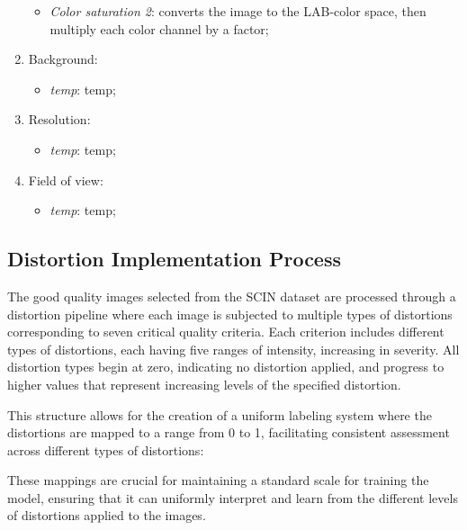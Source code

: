 \begin{enumerate}
\begin{itemize}
            \item \textit{Color saturation 2}: converts the image to the LAB-color space, then multiply each color channel by a factor;
        \end{itemize}
    \item Background:
        \begin{itemize}
            \item \textit{temp}: temp;
        \end{itemize}
    \item Resolution:
        \begin{itemize}
            \item \textit{temp}: temp;
        \end{itemize}
    \item Field of view:
        \begin{itemize}
            \item \textit{temp}: temp;
        \end{itemize}
\end{enumerate}

\subsection{Distortion Implementation Process}
\label{sub:DistImplement}
The good quality images selected from the SCIN dataset are processed through a distortion pipeline where each image is subjected to multiple types of distortions corresponding to seven critical quality criteria. Each criterion includes different types of distortions, each having five ranges of intensity, increasing in severity. All distortion types begin at zero, indicating no distortion applied, and progress to higher values that represent increasing levels of the specified distortion. \par
\vspace{\baselineskip}
\noindent
This structure allows for the creation of a uniform labeling system where the distortions are mapped to a range from 0 to 1, facilitating consistent assessment across different types of distortions:\par



\noindent
These mappings are crucial for maintaining a standard scale for training the model, ensuring that it can uniformly interpret and learn from the different levels of distortions applied to the images. \par



